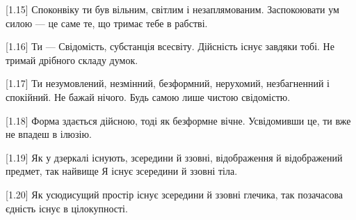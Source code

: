 [1.15] Споконвіку ти був вільним, світлим і незаплямованим. Заспокоювати ум силою --- це саме те, що тримає тебе в рабстві.

[1.16] Ти --- Свідомість, субстанція всесвіту. Дійсність існує завдяки тобі. Не тримай дрібного складу думок.

[1.17] Ти незумовлений, незмінний, безформний, нерухомий, незбагненний і спокійний. Не бажай нічого. Будь самою лише чистою свідомістю.

[1.18] Форма здається дійсною, тоді як безформне вічне. Усвідомивши це, ти вже не впадеш в ілюзію.

[1.19] Як у дзеркалі існують, зсередини й ззовні, відображення й відображений предмет, так найвище Я існує зсередини й ззовні тіла.

[1.20] Як усюдисущий простір існує зсередини й ззовні глечика, так позачасова єдність існує в цілокупності.
